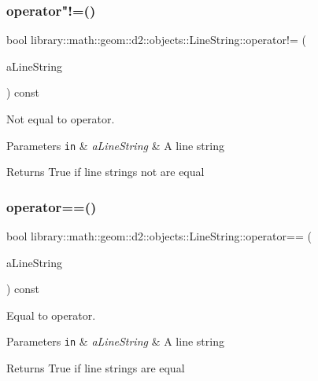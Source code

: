 \subsubsection{\texorpdfstring{operator"!=()}{operator!=()}}
{\footnotesize\ttfamily bool library\+::math\+::geom\+::d2\+::objects\+::\+Line\+String\+::operator!= (\begin{DoxyParamCaption}\item[{const \hyperlink{classlibrary_1_1math_1_1geom_1_1d2_1_1objects_1_1_line_string}{Line\+String} \&}]{a\+Line\+String }\end{DoxyParamCaption}) const}



Not equal to operator. 


\begin{DoxyParams}[1]{Parameters}
\mbox{\tt in}  & {\em a\+Line\+String} & A line string \\
\hline
\end{DoxyParams}
\begin{DoxyReturn}{Returns}
True if line strings not are equal 
\end{DoxyReturn}
\mbox{\label{classlibrary_1_1math_1_1geom_1_1d2_1_1objects_1_1_line_string_a9243f1af02509aa7053d5e8ed3a4223c}} 
\subsubsection{\texorpdfstring{operator==()}{operator==()}}
{\footnotesize\ttfamily bool library\+::math\+::geom\+::d2\+::objects\+::\+Line\+String\+::operator== (\begin{DoxyParamCaption}\item[{const \hyperlink{classlibrary_1_1math_1_1geom_1_1d2_1_1objects_1_1_line_string}{Line\+String} \&}]{a\+Line\+String }\end{DoxyParamCaption}) const}



Equal to operator. 


\begin{DoxyParams}[1]{Parameters}
\mbox{\tt in}  & {\em a\+Line\+String} & A line string \\
\hline
\end{DoxyParams}
\begin{DoxyReturn}{Returns}
True if line strings are equal 
\end{DoxyReturn}
\mbox{\label{classlibrary_1_1math_1_1geom_1_1d2_1_1objects_1_1_line_string_ae980ac86d1f2d8091151252aef2b6adc}} 
